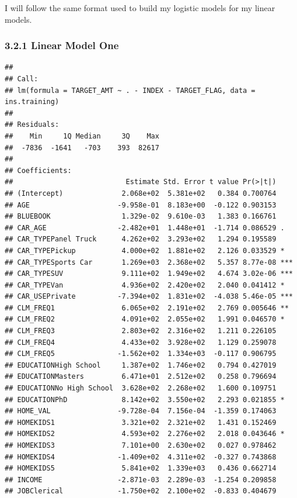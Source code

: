 \documentclass[]{article}
\begin{document}
I will follow the same format used to build my logistic models for my
linear models.

\subsubsection{3.2.1 Linear Model One}\label{linear-model-one}

\begin{verbatim}
## 
## Call:
## lm(formula = TARGET_AMT ~ . - INDEX - TARGET_FLAG, data = ins.training)
## 
## Residuals:
##    Min     1Q Median     3Q    Max 
##  -7836  -1641   -703    393  82617 
## 
## Coefficients:
##                           Estimate Std. Error t value Pr(>|t|)    
## (Intercept)              2.068e+02  5.381e+02   0.384 0.700764    
## AGE                     -9.958e-01  8.183e+00  -0.122 0.903153    
## BLUEBOOK                 1.329e-02  9.610e-03   1.383 0.166761    
## CAR_AGE                 -2.482e+01  1.448e+01  -1.714 0.086529 .  
## CAR_TYPEPanel Truck      4.262e+02  3.293e+02   1.294 0.195589    
## CAR_TYPEPickup           4.000e+02  1.881e+02   2.126 0.033529 *  
## CAR_TYPESports Car       1.269e+03  2.368e+02   5.357 8.77e-08 ***
## CAR_TYPESUV              9.111e+02  1.949e+02   4.674 3.02e-06 ***
## CAR_TYPEVan              4.936e+02  2.420e+02   2.040 0.041412 *  
## CAR_USEPrivate          -7.394e+02  1.831e+02  -4.038 5.46e-05 ***
## CLM_FREQ1                6.065e+02  2.191e+02   2.769 0.005646 ** 
## CLM_FREQ2                4.091e+02  2.055e+02   1.991 0.046570 *  
## CLM_FREQ3                2.803e+02  2.316e+02   1.211 0.226105    
## CLM_FREQ4                4.433e+02  3.928e+02   1.129 0.259078    
## CLM_FREQ5               -1.562e+02  1.334e+03  -0.117 0.906795    
## EDUCATIONHigh School     1.387e+02  1.746e+02   0.794 0.427019    
## EDUCATIONMasters         6.471e+01  2.512e+02   0.258 0.796694    
## EDUCATIONNo High School  3.628e+02  2.268e+02   1.600 0.109751    
## EDUCATIONPhD             8.142e+02  3.550e+02   2.293 0.021855 *  
## HOME_VAL                -9.728e-04  7.156e-04  -1.359 0.174063    
## HOMEKIDS1                3.321e+02  2.321e+02   1.431 0.152469    
## HOMEKIDS2                4.593e+02  2.276e+02   2.018 0.043646 *  
## HOMEKIDS3                7.101e+00  2.630e+02   0.027 0.978462    
## HOMEKIDS4               -1.409e+02  4.311e+02  -0.327 0.743868    
## HOMEKIDS5                5.841e+02  1.339e+03   0.436 0.662714    
## INCOME                  -2.871e-03  2.289e-03  -1.254 0.209858    
## JOBClerical             -1.750e+02  2.100e+02  -0.833 0.404679    

\end{verbatim}
\end{document}
